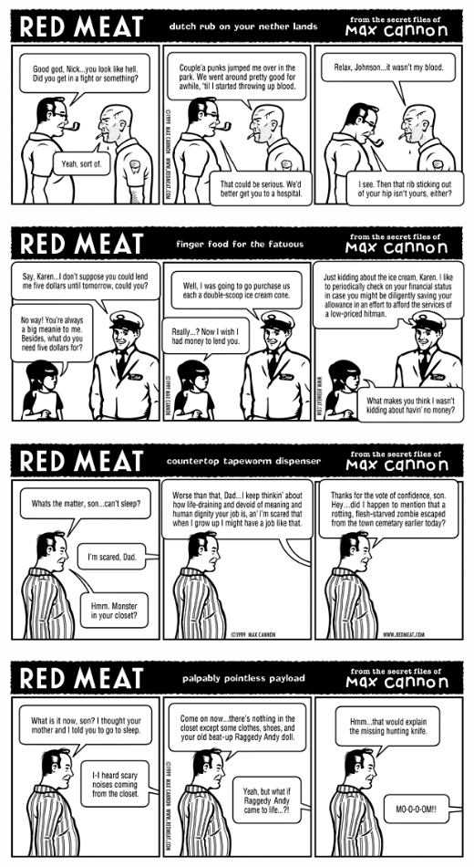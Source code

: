 \documentclass[a4paper,twoside,11pt]{article}
\begin{document}
\includegraphics[width=\textwidth]{redmeat_1999-11-22.png}



\includegraphics[width=\textwidth]{redmeat_1999-11-29.png}



\includegraphics[width=\textwidth]{redmeat_1999-12-06.png}



\includegraphics[width=\textwidth]{redmeat_1999-12-13.png}
\end{document}
